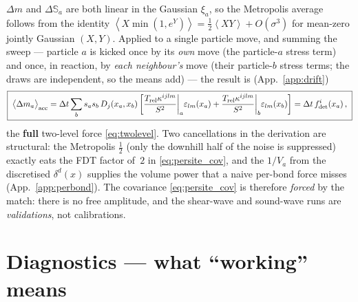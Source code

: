 \documentclass[12pt,aps,preprint,nofootinbib,noshowkeys,noshowpacs,longbibliography,superscriptaddress,tightenlines]{revtex4-2}
\def\Sbb{{\mathbb S}}
\def\llangle{\left\langle}
\def\rrangle{\right\rangle}
\def\app#1{App.~\ref{#1}}
\def\st{\begin{equation}}
\def\stp{\end{equation}}
\begin{document}
$\Delta m$ and $\Delta\Sbb_a$ are both linear in the Gaussian $\xi_a$, so the
Metropolis average follows from the identity
$\llangle X\min(1,e^{Y})\rrangle=\tfrac12\llangle XY\rrangle+O(\sigma^3)$ for
mean-zero jointly Gaussian $(X,Y)$.  Applied to a single particle move, and summing the
sweep --- particle $a$ is kicked once by its \emph{own} move (the particle-$a$
stress term) and once, in reaction, by \emph{each neighbour's} move (their
particle-$b$ stress terms; the draws are independent, so the means add) --- the
result is (\app{app:drift})
\st
\label{eq:drift_full}
\boxed{\;
\big\langle\Delta m_a\big\rangle_{\rm acc}
  = \Delta t\sum_b s_a s_b\,D_j(x_a,x_b)
    \left[\frac{T_{\rm rel}\kappa^{ijlm}}{S^2}\bigg|_a\varepsilon_{lm}(x_a)
        + \frac{T_{\rm rel}\kappa^{ijlm}}{S^2}\bigg|_b\varepsilon_{lm}(x_b)\right]
  = \Delta t\,f^i_{\rm det}(x_a)\,,\;}
\stp
the \textbf{full} two-level force \eqref{eq:twolevel}.  Two cancellations in
the derivation are structural: the Metropolis $\tfrac12$ (only the downhill
half of the noise is suppressed) exactly eats the FDT factor of~$2$ in
\eqref{eq:persite_cov}, and the $1/V_a$ from the discretised $\delta^d(x)$
supplies the volume power that a naive per-bond force misses
(\app{app:perbond}).  The covariance \eqref{eq:persite_cov} is therefore
\emph{forced} by the match: there is no free amplitude, and the shear-wave and
sound-wave runs are \emph{validations}, not calibrations.

\section{Diagnostics --- what ``working'' means}
\label{sec:checks}
\end{document}
